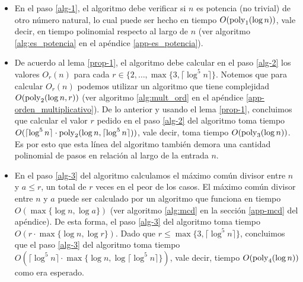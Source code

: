 	\begin{itemize}
	\item En el paso \ref{alg-1}, el algoritmo debe verificar si $n$ es potencia (no trivial) de otro número natural, lo cual puede ser hecho en tiempo $O({\rm poly}_1(\log n))$, vale decir, en tiempo polinomial respecto al largo de $n$ (ver algoritmo \ref{alg:es_potencia} 
	en el apéndice \ref{app-es_potencia}).
	
	\item De acuerdo al lema \ref{prop-1}, el algoritmo debe calcular en el paso \ref{alg-2} los valores $O_r(n)$ para cada $r \in \{2, \ldots, \max\{3,\lceil \log^5 n\rceil\}$. Notemos que para calcular $O_r(n)$ podemos utilizar un algoritmo  que tiene complejidad $O({\rm poly}_2(\log n, r))$ (ver algoritmo \ref{alg:mult_ord} en el apéndice \ref{app-orden_multiplicativo}).
	De lo anterior y usando el lema \ref{prop-1}, concluimos que calcular el valor $r$ pedido en el paso \ref{alg-2} del algoritmo toma tiempo $O(\lceil \log^5 n\rceil \cdot {\rm poly}_2(\log n, \lceil \log^5 n\rceil))$, vale decir, toma tiempo $O({\rm poly}_3(\log n))$. 
	Es por esto que esta línea del algoritmo también demora una cantidad polinomial de pasos en relación al largo de la entrada $n$.
	
	\item En el paso \ref{alg-3} del algoritmo calculamos el máximo común divisor entre $n$ y $a\leq r$, un total de $r$ veces en el peor de los casos. El máximo común divisor entre $n$ y $a$ puede ser calculado por un algoritmo que funciona en tiempo $O(\max\{\log n, \log a\})$ (ver algoritmo \ref{alg:mcd} en la sección \ref{app-mcd} del apéndice). De esta forma, el paso \ref{alg-3} del algoritmo toma tiempo $O(r \cdot \max\{\log n, \log r\})$. Dado que $r\leq \max\{3,\lceil \log ^5 n\rceil\}$, concluimos que el paso \ref{alg-3} del algoritmo toma tiempo $O(\lceil \log ^5 n\rceil \cdot \max\{\log n, \log \lceil \log ^5 n\rceil\})$, vale decir, tiempo $O({\rm poly}_4(\log n))$ como era esperado. 
	

\end{itemize}
